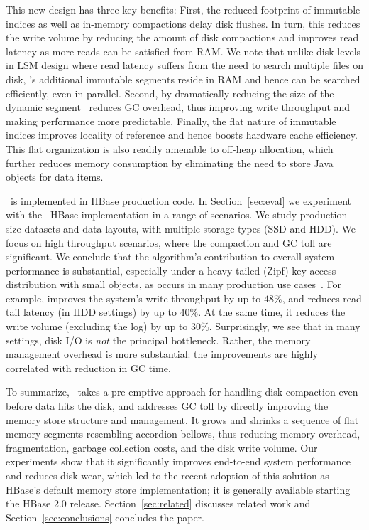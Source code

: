This new design has three key benefits: 
 First, the reduced footprint of immutable indices as well as in-memory compactions delay disk flushes. In turn, this reduces 
 the write volume by reducing the amount of disk compactions  and improves read latency as more reads can be satisfied from RAM.
We note that unlike disk levels in LSM design where read latency suffers from the need to
search multiple files on disk,  \sys's additional immutable segments reside in RAM and hence can be searched efficiently, even in parallel.
 Second, by dramatically reducing the size of the dynamic segment  \sys\ reduces GC overhead, thus improving write throughput and making performance more predictable.
Finally, the flat nature of immutable indices improves locality of reference and hence boosts hardware cache efficiency. 
This flat organization is also readily amenable to off-heap allocation, which further reduces memory consumption
 by eliminating the need to store Java objects for data items. 

 
\sys\ is implemented in HBase production code. In Section~\ref{sec:eval} we experiment with the \sys\ HBase implementation in a range of scenarios.
We study production-size datasets and data layouts, with multiple storage types (SSD and HDD). 
We focus on high throughput scenarios, where the compaction and GC toll are significant. 
We conclude that the algorithm's contribution to overall system performance is substantial, 
especially under a  heavy-tailed (Zipf) key access distribution with 
small objects, as occurs in many production use cases~\cite{Wu2015}. For example, \sys\/ 
improves the system's write throughput by up to $48\%$, and reduces read tail latency 
(in HDD settings)  
by up to $40\%$. At the same time, it reduces the write volume (excluding the log) by up to $30\%$. Surprisingly, we see 
that in many settings, disk I/O is \emph{not} the principal bottleneck. Rather, the memory management 
overhead is more substantial: the improvements are highly correlated with  reduction in GC time. 

To summarize, \sys\ takes a pre-emptive approach for handling disk compaction even before data hits the disk, and addresses GC toll by directly improving the memory store structure and management.
It grows and shrinks a sequence of flat memory segments resembling accordion bellows, 
thus reducing memory overhead, fragmentation, garbage collection costs, and the disk write volume. 
Our experiments show that it significantly improves end-to-end system performance and reduces disk wear, 
which led to the recent adoption of this solution as HBase's default memory store implementation; it is generally available starting the HBase 2.0 release.
 Section~\ref{sec:related} discusses related work 
and Section~\ref{sec:conclusions} concludes the paper.

